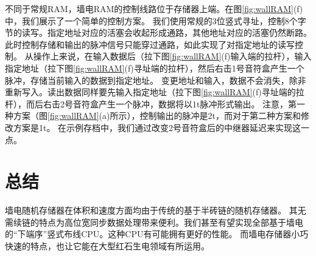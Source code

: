 \documentclass[UTF8,12pt,punct=kaiming,fontset=none]{article}
\begin{document}
不同于常规RAM，墙电RAM的控制线路位于存储器上端。在图\ref{fig:wallRAM}(f)中，我们展示了一个简单的控制方案。
我们使用常规的3位竖式寻址，控制8个字节的读写。指定地址对应的活塞会收起形成通路，其他地址对应的活塞仍然断路。
此时控制存储和输出的脉冲信号只能穿过通路，如此实现了对指定地址的读写控制。
从操作上来说，在输入数据后（拉下图\ref{fig:wallRAM}(f)输入端的拉杆），输入指定地址（拉下图\ref{fig:wallRAM}(f)寻址端的拉杆），然后右击1号音符盒产生一个脉冲，存储当前输入的数据到指定地址。
变更地址和输入，数据不会消失，除非重新写入。读出数据同样要先输入指定地址（拉下图\ref{fig:wallRAM}(f)寻址端的拉杆），而后右击2号音符盒产生一个脉冲，数据将以1t脉冲形式输出。
注意，第一种方案（图\ref{fig:wallRAM}(a)所示），控制输出的脉冲是2t，而对于第二种方案和修改方案是1t。
在示例存档中，我们通过改变2号音符盒后的中继器延迟来实现这一点。

\section{总结}
墙电随机存储器在体积和速度方面均由于传统的基于半砖链的随机存储器。
其无需续链的特点为高位宽同步数据处理带来便利。我们甚至有望实现全部基于墙电的“下端序”竖式布线CPU。这种CPU有可能拥有更好的性能。
而墙电存储器小巧快速的特点，也让它能在大型红石生电领域有所运用。



\end{document}
